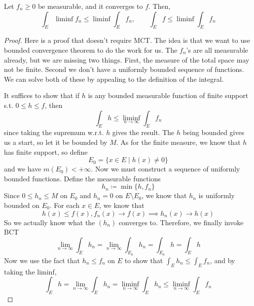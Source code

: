   \begin{lemma}
    Let $f_n \geq 0$ be measurable, and it converges to $f$. Then, 
    \begin{equation}
      \int_E \liminf{f_n} \leq \liminf \int_E f_n, \qquad \int_E f \leq \liminf \int_E f_n
    \end{equation}
  \end{lemma}
  \begin{proof}
    Here is a proof that doesn't require MCT. The idea is that we want to use bounded convergence theorem to do the work for us. The $f_n$'s are all measurable already, but we are missing two things. First, the measure of the total space may not be finite. Second we don't have a uniformly bounded sequence of functions. We can solve both of these by appealing to the definition of the integral. 

    It suffices to show that if $h$ is any bounded measurable function of finite support s.t. $0 \leq h \leq f$, then 
    \begin{equation}
      \int_E h \leq \liminf_{n \to \infty} \int_E f_n 
    \end{equation}
    since taking the supremum w.r.t. $h$ gives the result. The $h$ being bounded gives us a start, so let it be bounded by $M$. As for the finite measure, we know that $h$ has finite support, so define 
    \begin{equation}
      E_0 = \{x  \in E \mid h(x) \neq 0 \}
    \end{equation}
    and we have $m(E_0) < +\infty$. Now we must construct a sequence of uniformly bounded functions. Define the measurable functions
    \begin{equation}
      h_n \coloneqq \min\{ h, f_n \}
    \end{equation}
    Since $0 \leq h_n \leq M$ on $E_0$ and $h_n = 0$ on $E \setminus E_0$, we know that $h_n$ is uniformly bounded on $E_0$. For each $x \in E$, we know that 
    \begin{equation}
      h(x) \leq f(x), f_n (x) \to f(x) \implies h_n (x) \to h(x)
    \end{equation}
    So we actually know what the $(h_n)$ converges to. Therefore, we finally invoke BCT 
    \begin{equation}
      \lim_{n \to \infty} \int_E h_n = \lim_{n \to \infty} \int_{E_0} h_n = \int_{E_0} h = \int_E h
    \end{equation}
    Now we use the fact that $h_n \leq f_n$ on $E$ to show that $\int_E h_n \leq \int_E f_n$, and by taking the liminf, 
    \begin{equation}
      \int_E h = \lim_{n \to \infty} \int_E h_n = \liminf_{n \to \infty} \int_E h_n \leq \liminf_{n \to \infty} \int_E f_n 
    \end{equation}
  \end{proof}
